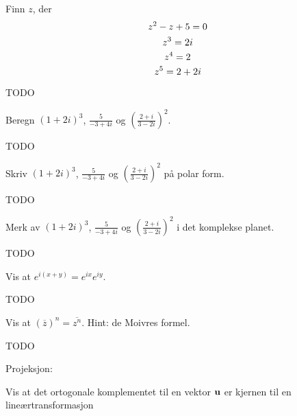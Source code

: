 
\begin{oppgave}
Finn $z$, der
\[
z^2-z+5=0 \\
\]
\[
z^3=2i \\
\]
\[
z^4=2 \\
\]
\[
z^5=2+2i \\
\]
\end{oppgave}

\begin{losning}
TODO
\end{losning}


\begin{oppgave}
Beregn $(1+2i)^3$, $\frac{5}{-3+4i}$ og $\left(\frac{2+i}{3-2i}\right)^2$.
\end{oppgave}

\begin{losning}
TODO
\end{losning}


\begin{oppgave}
Skriv $(1+2i)^3$, $\frac{5}{-3+4i}$ og $\left(\frac{2+i}{3-2i}\right)^2$ på polar form.
\end{oppgave}

\begin{losning}
TODO
\end{losning}


\begin{oppgave}
Merk av $(1+2i)^3$, $\frac{5}{-3+4i}$ og $\left(\frac{2+i}{3-2i}\right)^2$ i det komplekse planet.
\end{oppgave}

\begin{losning}
TODO
\end{losning}


\begin{oppgave}
Vis at $e^{i(x+y)}=e^{ix}e^{iy}$.
\end{oppgave}

\begin{losning}
TODO
\end{losning}


\begin{oppgave}
Vis at $(\overline z)^n=\overline{z^n}$. Hint: de Moivres formel.
\end{oppgave}


\begin{losning}
TODO
\end{losning}


Projeksjon:

\begin{oppgave}
Vis at det ortogonale komplementet til en vektor $\mathbf{u}$ er kjernen til en lineærtransformasjon
\end{oppgave}

